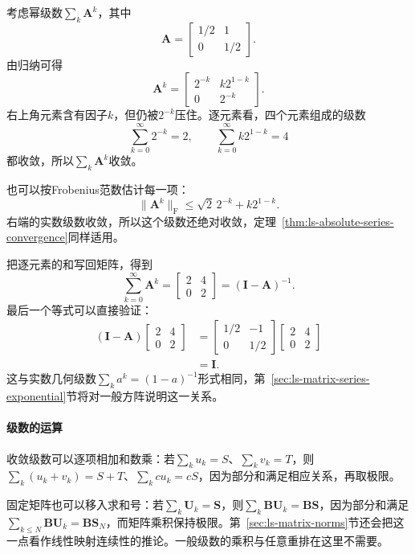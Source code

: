 \begin{example}[矩阵几何级数]
\label{ex:ls-matrix-geometric-series}
考虑幂级数$\sum_k\bm A^k$，其中
\[
 \bm A=\begin{bmatrix}1/2&1\\0&1/2\end{bmatrix}.
\]
由归纳可得
\[
 \bm A^k=\begin{bmatrix}2^{-k}&k2^{1-k}\\0&2^{-k}\end{bmatrix}.
\]
右上角元素含有因子$k$，但仍被$2^{-k}$压住。逐元素看，四个元素组成的级数
\[
 \sum_{k=0}^\infty2^{-k}=2,\qquad\sum_{k=0}^\infty k2^{1-k}=4
\]
都收敛，所以$\sum_k\bm A^k$收敛。

也可以按Frobenius范数估计每一项：
\[
 \lVert\bm A^k\rVert_{\mathrm F}\leq\sqrt2\,2^{-k}+k2^{1-k}.
\]
右端的实数级数收敛，所以这个级数还绝对收敛，定理~\ref{thm:ls-absolute-series-convergence}同样适用。

把逐元素的和写回矩阵，得到
\[
 \sum_{k=0}^\infty\bm A^k=\begin{bmatrix}2&4\\0&2\end{bmatrix}=(\bm I-\bm A)^{-1}.
\]
最后一个等式可以直接验证：
\[
 \begin{aligned}
 (\bm I-\bm A)\begin{bmatrix}2&4\\0&2\end{bmatrix}
 &=\begin{bmatrix}1/2&-1\\0&1/2\end{bmatrix}\begin{bmatrix}2&4\\0&2\end{bmatrix}\\
 &=\bm I.
 \end{aligned}
\]
这与实数几何级数$\sum_ka^k=(1-a)^{-1}$形式相同，第~\ref{sec:ls-matrix-series-exponential}节将对一般方阵说明这一关系。
\end{example}

\paragraph{级数的运算}
收敛级数可以逐项相加和数乘：若$\sum_ku_k=S$、$\sum_kv_k=T$，则$\sum_k(u_k+v_k)=S+T$、$\sum_kcu_k=cS$，因为部分和满足相应关系，再取极限。

固定矩阵也可以移入求和号：若$\sum_k\bm U_k=\bm S$，则$\sum_k\bm B\bm U_k=\bm B\bm S$，因为部分和满足$\sum_{k\leq N}\bm B\bm U_k=\bm B\bm S_N$，而矩阵乘积保持极限。第~\ref{sec:ls-matrix-norms}节还会把这一点看作线性映射连续性的推论。一般级数的乘积与任意重排在这里不需要。

